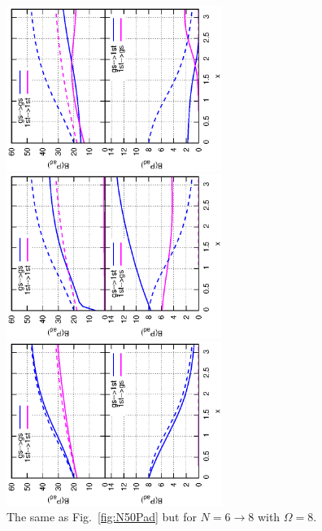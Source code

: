 \documentclass[%
superscriptaddress,
preprint,
showpacs,
nofootinbib,
amsmath,amssymb,
aps,
prc,
floatfix ]%
{revtex4-1}
\begin{document}
\begin{figure}[htbp]
 \begin{minipage}{0.3\hsize}
 \begin{center}
  \includegraphics[width=70mm,angle=-90]{N8Pad_CQ.eps}
 \end{center}
 \captionsetup{labelformat=empty,labelsep=none}
 \end{minipage}
 \begin{minipage}{0.3\hsize}
 \begin{center}
  \includegraphics[width=70mm,angle=-90]{N8Pad_FD.eps}
 \end{center}
 \captionsetup{labelformat=empty,labelsep=none}
 \end{minipage}
 \begin{minipage}{0.3\hsize}
 \begin{center}
  \includegraphics[width=70mm,angle=-90]{N8Pad_SPA.eps}
 \end{center}
 \captionsetup{labelformat=empty,labelsep=none}
 \end{minipage}
	\caption{The same as Fig.~\ref{fig:N50Pad} but for $N=6\rightarrow 8$
	with $\Omega=8$.
}
 \label{fig:N8Pad}
\end{figure}
\end{document}
